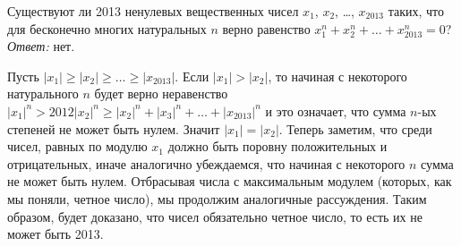 \problem{}
Существуют ли 2013 ненулевых вещественных чисел
$x_1$, $x_2$, \ldots, $x_{2013}$ таких,
что для бесконечно многих натуральных $n$
верно равенство $x_1^n + x_2^n + \ldots + x_{2013}^n = 0$?
\solution
\emph{Ответ:} нет.
\par
Пусть $|x_1| \geq |x_2| \geq \ldots \geq |x_{2013}|$.
Если $|x_1| > |x_2|$, то начиная с некоторого натурального $n$ будет верно
неравенство
$|x_1|^n > 2012 |x_2|^n \geq |x_2|^n + |x_3|^n + \ldots + |x_{2013}|^n$
и это означает, что сумма $n$-ых степеней не может быть нулем.
Значит $|x_1| = |x_2|$.
Теперь заметим, что среди чисел, равных по модулю $x_1$ должно быть поровну
положительных и отрицательных, иначе аналогично убеждаемся, что начиная с
некоторого $n$ сумма не может быть нулем.
Отбрасывая числа с максимальным модулем (которых, как мы поняли, четное число),
мы продолжим аналогичные рассуждения.
Таким образом, будет доказано, что чисел обязательно четное число, то есть их
не может быть 2013.
\endproblem
